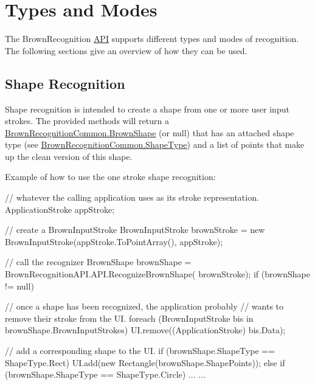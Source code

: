 \hypertarget{index_a}{}\section{\-Types and Modes}\label{index_a}
\-The \-Brown\-Recognition \hyperlink{class_brown_recognition_a_p_i_1_1_a_p_i}{\-A\-P\-I} supports different types and modes of recognition. \-The following sections give an overview of how they can be used.\hypertarget{index_aa}{}\subsection{\-Shape Recognition}\label{index_aa}
\-Shape recognition is intended to create a shape from one or more user input strokes. \-The provided methods will return a \hyperlink{class_brown_recognition_common_1_1_brown_shape}{\-Brown\-Recognition\-Common.\-Brown\-Shape} (or null) that has an attached shape type (see \hyperlink{namespace_brown_recognition_common_a86340ddb3d90188573ed7b4484046ec3}{\-Brown\-Recognition\-Common.\-Shape\-Type}) and a list of points that make up the clean version of this shape. \par
 \par
 \-Example of how to use the one stroke shape recognition\-: 
\begin{DoxyCode}
 // whatever the calling application uses as its stroke representation. 
 ApplicationStroke appStroke; 
 
 // create a BrownInputStroke
 BrownInputStroke brownStroke = new BrownInputStroke(appStroke.ToPointArray(), 
      appStroke);
 
 // call the recognizer
 BrownShape brownShape = BrownRecognitionAPI.API.RecognizeBrownShape(
      brownStroke);
 if (brownShape != null) {
     // once a shape has been recognized, the application probably
     // wants to remove their stroke from the UI.
     foreach (BrownInputStroke bis in brownShape.BrownInputStrokes) {
         UI.remove((ApplicationStroke) bis.Data);
     }
     
     // add a corresponding shape to the UI.
     if (brownShape.ShapeType == ShapeType.Rect) {
         UI.add(new Rectangle(brownShape.ShapePoints));
     }
     else if (brownShape.ShapeType == ShapeType.Circle) {
         ...
     }
     ...
 }
\end{DoxyCode}


